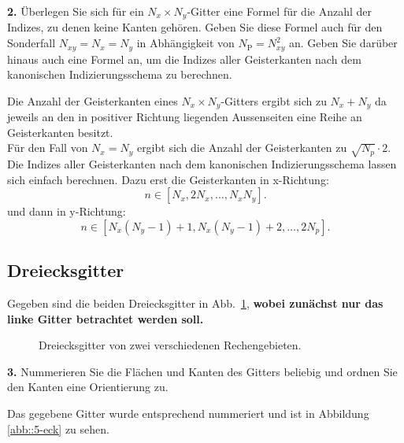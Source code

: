 \documentclass[Protokollheft.tex]{subfiles}
\begin{document}
        \begin{framed}
	\noindent \textbf{2.} \label{vorb:formel} Überlegen Sie sich für ein $N_x\times N_y$-Gitter eine Formel für die
        Anzahl der Indizes, zu denen keine Kanten gehören. Geben Sie diese Formel auch für den Sonderfall
        $N_{xy}=N_x=N_y$ in Abhängigkeit von $N_{\text{P}}=N_{xy}^2$ an. Geben Sie darüber hinaus auch eine Formel an, um die Indizes aller Geisterkanten nach dem kanonischen Indizierungsschema zu berechnen.\label{exer:nrOfGhostEdges}
\end{framed}
\noindent
Die Anzahl der Geisterkanten eines $N_x \times N_y$-Gitters ergibt sich zu $N_x + N_y$ da jeweils an den in positiver Richtung liegenden Aussenseiten eine Reihe an Geisterkanten besitzt.\\
Für den Fall von $N_x = N_y$ ergibt sich die Anzahl der Geisterkanten zu $\sqrt{N_p} \cdot 2$. Die Indizes aller Geisterkanten nach dem kanonischen Indizierungsschema lassen sich einfach berechnen. Dazu erst die Geisterkanten in x-Richtung:
\begin{equation*}
	n\in[N_x,2N_x,\dots,N_xN_y].
\end{equation*}
und dann in y-Richtung:
\begin{equation*}
n\in[N_x(N_y-1)+1,N_x(N_y-1)+2,\dots,2N_p].
\end{equation*}
%
    {\subsection{Dreiecksgitter}}
    Gegeben sind die beiden Dreiecksgitter in Abb.~\ref{fig:tetmesh}, \textbf{wobei
    zunächst nur das linke Gitter betrachtet werden soll.}
  \begin{figure}[htb]
    \centering
    \begin{subfigure}{0.49\textwidth}
        \centering
                    
    \end{subfigure}
    \begin{subfigure}{0.49\textwidth}
        \centering
        
    \end{subfigure}
    \caption{Dreiecksgitter von zwei verschiedenen Rechengebieten.}
    \label{fig:tetmesh}
  \end{figure}

        \begin{framed}
	\noindent \textbf{3.} Nummerieren Sie die Flächen und Kanten des Gitters beliebig und ordnen
                    Sie den Kanten eine Orientierung zu.\label{exer:triangleOrderedNumbering}
\end{framed}
\noindent
Das gegebene Gitter wurde entsprechend nummeriert und ist in Abbildung \ref{abb::5-eck} zu sehen.
\end{document}
